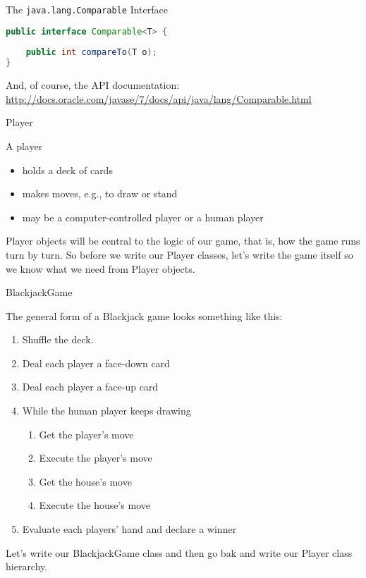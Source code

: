 \documentclass{beamer}
\begin{document}
\begin{frame}[fragile]{The {\tt java.lang.Comparable} Interface}


\begin{lstlisting}[language=Java]
public interface Comparable<T> {
    
    public int compareTo(T o);
}
\end{lstlisting}

And, of course, the API documentation: \url{http://docs.oracle.com/javase/7/docs/api/java/lang/Comparable.html}

\end{frame}

\begin{frame}[fragile]{Player}


A player
\begin{itemize}
\item holds a deck of cards
\item makes moves, e.g., to draw or stand
\item may be a computer-controlled player or a human player
\end{itemize}

Player objects will be central to the logic of our game, that is, how the game runs turn by turn.  So before we write our Player classes, let's write the game itself so we know what we need from Player objects.

\end{frame}

\begin{frame}[fragile]{BlackjackGame}


The general form of a Blackjack game looks something like this:
\begin{enumerate}
\item Shuffle the deck.
\item Deal each player a face-down card
\item Deal each player a face-up card
\item While the human player keeps drawing
\begin{enumerate}
\item Get the player's move
\item Execute the player's move
\item Get the house's move
\item Execute the house's move
\end{enumerate}
\item Evaluate each players' hand and declare a winner
\end{enumerate}

Let's write our BlackjackGame class and then go bak and write our Player class hierarchy.

\end{frame}
\end{document}
